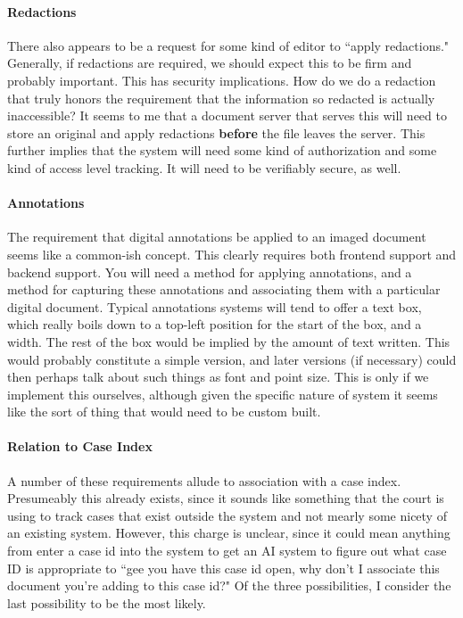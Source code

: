 \paragraph{Redactions}There also appears to be a request for some kind of
editor to ``apply redactions."  Generally, if redactions are required, we
should expect this to be firm and probably important.  This has security
implications.  How do we do a redaction that truly honors the requirement that
the information so redacted is actually inaccessible?  It seems to me that a
document server that serves this will need to store an original and apply
redactions \textbf{before} the file leaves the server.  This further implies
that the system will need some kind of authorization and some kind of access
level tracking.  It will need to be verifiably secure, as well.

\paragraph{Annotations}The requirement that digital annotations be applied to
an imaged document seems like a common-ish concept.  This clearly requires both
frontend support and backend support.  You will need a method for applying
annotations, and a method for capturing these annotations and associating them
with a particular digital document.  Typical annotations systems will tend to
offer a text box, which really boils down to a top-left position for the start
of the box, and a width.  The rest of the box would be implied by the amount of
text written.  This would probably constitute a simple version, and later
versions (if necessary) could then perhaps talk about such things as font and
point size.  This is only if we implement this ourselves, although given the
specific nature of system it seems like the sort of thing that would need to be
custom built.

\paragraph{Relation to Case Index}A number of these requirements allude to
association with a case index.  Presumeably this already exists, since it
sounds like something that the court is using to track cases that exist outside
the system and not mearly some nicety of an existing system.  However, this
charge is unclear, since it could mean anything from enter a case id into the
system to get an AI system to figure out what case ID is appropriate to ``gee
you have this case id open, why don't I associate this document you're adding
to this case id?"  Of the three possibilities, I consider the last possibility
to be the most likely.

